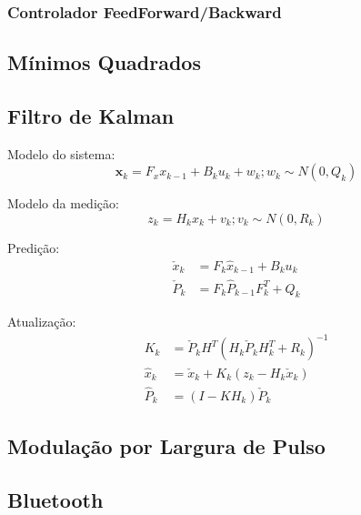 \subsubsection{Controlador FeedForward/Backward}

\subsection{Mínimos Quadrados}

\subsection{Filtro de Kalman}

Modelo do sistema:
\begin{equation}
\textbf{x}_k = F_x x_{k-1} + B_k u_k + w_k; w_k \sim N(0, Q_k)
\end{equation}

Modelo da medição:
\begin{equation}
z_k = H_k x_k + v_k; v_k \sim N(0, R_k)
\end{equation}

Predição:
\begin{align*}
    \check{x}_k &= F_k \hat{x}_{k-1} + B_k u_k\\
    \check{P}_k &= F_k \hat{P}_{k-1} F^T_k + Q_k
\end{align*}

Atualização:
\begin{align*}
    K_k &= \check{P}_k H^T \left( H_k \check{P}_k H^T_k + R_k\right)^{-1}\\
    \hat{x}_k &= \check{x}_k + K_k\left( z_k - H_k \check{x}_k \right)\\
    \hat{P}_k &= \left(I - KH_k \right)\check{P}_k
\end{align*}


\subsection{Modulação por Largura de Pulso}

\subsection{Bluetooth}

